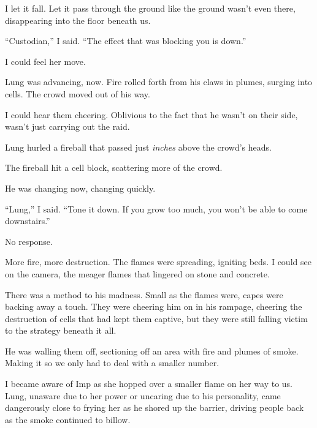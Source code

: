 I let it fall.  Let it pass through the ground like the ground wasn't even there, disappearing into the floor beneath us.



``Custodian,'' I said.  ``The effect that was blocking you is down.''



I could feel her move.



Lung was advancing, now.  Fire rolled forth from his claws in plumes, surging into cells.  The crowd moved out of his way.



I could hear them cheering.  Oblivious to the fact that he wasn't on their side, wasn't just carrying out the raid.



Lung hurled a fireball that passed just \emph{inches} above the crowd's heads.



The fireball hit a cell block, scattering more of the crowd.



He was changing now, changing quickly.



``Lung,'' I said.  ``Tone it down.  If you grow too much, you won't be able to come downstairs.''



No response.



More fire, more destruction.  The flames were spreading, igniting beds.  I could see on the camera, the meager flames that lingered on stone and concrete.



There was a method to his madness.  Small as the flames were, capes were backing away a touch.  They were cheering him on in his rampage, cheering the destruction of cells that had kept them captive, but they were still falling victim to the strategy beneath it all.



He was walling them off, sectioning off an area with fire and plumes of smoke.  Making it so we only had to deal with a smaller number.



I became aware of Imp as she hopped over a smaller flame on her way to us.  Lung, unaware due to her power or uncaring due to his personality, came dangerously close to frying her as he shored up the barrier, driving people back as the smoke continued to billow.



